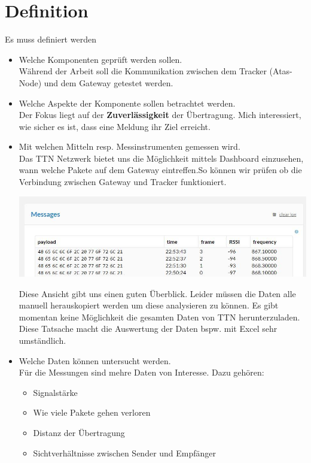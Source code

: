 \documentclass[11pt,english,german]{report}
\theoremstyle{definition}
\begin{document}
\section{Definition}
Es muss definiert werden
\begin{itemize}
	\item Welche Komponenten geprüft werden sollen.\\[0.3cm]
	Während der Arbeit soll die Kommunikation zwischen dem Tracker (Atas-Node) und dem Gateway getestet werden.
	\item Welche Aspekte der Komponente sollen betrachtet werden.\\[0.3cm]
	Der Fokus liegt auf der \textbf{Zuverlässigkeit} der Übertragung. Mich interessiert, wie sicher es ist, dass eine Meldung ihr Ziel erreicht. 
	\item Mit welchen Mitteln resp. Messinstrumenten gemessen wird.\\[0.3cm]	
	Das TTN Netzwerk bietet uns die Möglichkeit mittels Dashboard einzusehen, wann welche Pakete auf dem Gateway eintreffen.So können wir prüfen ob die Verbindung zwischen Gateway und Tracker funktioniert. \\
	
	\begin{minipage}{\linewidth}
		\centering
		\includegraphics[width=\linewidth]{img/ttn/ttn_messages}
	\end{minipage}

	Diese Ansicht gibt uns einen guten Überblick. Leider müssen die Daten alle manuell herauskopiert werden um diese analysieren zu können. Es gibt momentan keine Möglichkeit die gesamten Daten von TTN herunterzuladen. Diese Tatsache macht die Auswertung der Daten bspw. mit Excel sehr umständlich.
	
	\item Welche Daten können untersucht werden.\\[0.3cm]
	Für die Messungen sind mehre Daten von Interesse. Dazu gehören: 
	\begin{itemize}
		\item Signalstärke
		\item Wie viele Pakete gehen verloren
		\item Distanz der Übertragung
		\item Sichtverhältnisse zwischen Sender und Empfänger
	\end{itemize}
\end{itemize}
\end{document}
